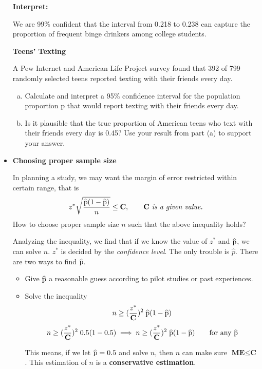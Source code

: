 \documentclass[a4paper, 12pt,twoside]{book}
\newcommand\reallywidehat[1]{%
\savestack{\tmpbox}{\stretchto{%
  \scaleto{%
    \scalerel*[\widthof{\ensuremath{#1}}]{\kern-.6pt\bigwedge\kern-.6pt}%
    {\rule[-\textheight/2]{1ex}{\textheight}}%
  }{\textheight}%
}{0.5ex}}%
\stackon[1pt]{#1}{\tmpbox}%
}
\begin{document}
\begin{itemize}
{{   \textbf{Interpret:}\vspace{0.3cm}
   
   We are 99\% confident that the interval from 0.218 to 0.238 can capture the proportion of frequent binge drinkers among college students.
}}
\newpage
\colorbox{champagne}{\parbox{\textwidth}{
\textbf{Teens' Texting}\vspace{0.3cm}

 A Pew Internet and American Life Project survey found that 392 of 799 randomly selected teens reported texting with their friends every day. \vspace{0.3cm}
 
 \begin{enumerate}[(a)]
     \item Calculate and interpret a 95\% confidence  interval for the population proportion p that would report texting with their friends every day.
     \item Is it plausible that the true proportion of American teens who text with their friends every day is 0.45? Use your result from part (a) to support your answer.
 \end{enumerate} 
}}


\newpage

\item \textbf{Choosing proper sample size}\vspace{0.3cm}

In planning a study, we may want the margin of error restricted within certain range, that is 
$$z^* \sqrt{\frac{\reallywidehat{p}(1-\reallywidehat{p})}{n}} \leq \textbf{C}, \qquad \textbf{C} \textit{ is a given value.}$$
How to choose proper sample size $n$ such that the above inequality holds?\vspace{0.3cm}

Analyzing the inequality, we find that if we know the value of  $z^*$ and $\reallywidehat{p}$, we can solve $n$. $z^*$ is decided by the \textit{confidence level}. The only trouble is $\hat{p}$. There are two ways to find $\reallywidehat{p}$.
    \begin{itemize}
        \item Give $\reallywidehat{p}$ a reasonable guess according to pilot studies or past experiences.\vspace{0.3cm}
        
        \item Solve the inequality
        $$n \geq (\frac{z^*}{\textbf{C}})^2\;\reallywidehat{p}(1-\reallywidehat{p})$$
         $$\displaystyle{n \geq (\frac{z^*}{\textbf{C}})^2 \;0.5(1-0.5)
        \implies n \geq (\frac{z^*}{\textbf{C}})^2\; \reallywidehat{p}(1-\reallywidehat{p})\qquad \text{for any }  \reallywidehat{p}}$$\vspace{0.3cm}
        
         This means, if we let $\reallywidehat{p} = 0.5$ and solve $n$, then $n$ can make sure  $\textbf{ME} \leq \textbf{C}$. This estimation of $n$ is a \textbf{conservative estimation}.
    \end{itemize}
\end{itemize}
\vspace{0.6cm}
\end{document}
